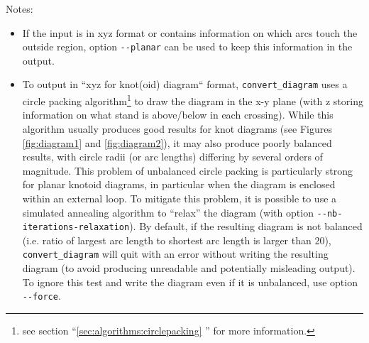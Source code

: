 Notes:
\begin{itemize}
\item If the input is in xyz format or contains information on which arcs
  touch the outside region, option \lstinline{--planar} can be used to keep this information 
  in the output.
\item To output in ``xyz for knot(oid) diagram`` format, \lstinline{convert_diagram} uses a circle packing algorithm\footnote{see section ``\ref{sec:algorithms:circlepacking} '' for more information.} to draw the diagram in the x-y plane (with z storing information on what stand is above/below in each crossing). While this algorithm usually produces good results for knot diagrams (see Figures \ref{fig:diagram1} and \ref{fig:diagram2}), it may also produce poorly balanced results, with circle radii (or arc lengths) differing by several orders of magnitude. This problem of unbalanced circle packing is particularly strong for planar knotoid diagrams, in particular when the diagram is enclosed within an external loop. To mitigate this problem, it is possible to use a simulated annealing algorithm to ``relax'' the diagram (with option \lstinline{--nb-iterations-relaxation}).
  By default, if the resulting diagram is not balanced (i.e. ratio of largest arc length to shortest arc length is larger than 20), \lstinline{convert_diagram} will quit with an error without writing the resulting diagram (to avoid producing unreadable and potentially misleading output). To ignore this test and write the diagram even if it is unbalanced, use option \lstinline{--force}.
\end{itemize}


